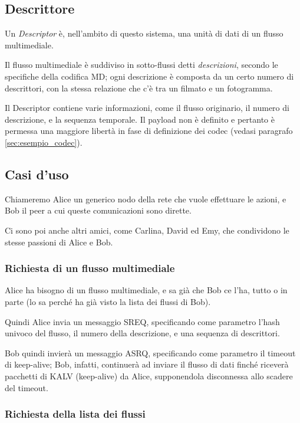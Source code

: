 \subsection{Descrittore}


Un \emph{Descriptor} è, nell'ambito di questo sistema, una unità di dati di un
flusso multimediale.

Il flusso multimediale è suddiviso in sotto-flussi detti \emph{descrizioni},
secondo le specifiche della codifica MD; ogni descrizione è composta da un certo numero
di descrittori, con la stessa relazione che c'è tra un filmato e un fotogramma.

Il Descriptor contiene varie informazioni, come il flusso originario, il numero
di descrizione, e la sequenza temporale. Il payload non è definito e pertanto è
permessa una maggiore libertà in fase di definizione dei codec (vedasi
paragrafo \ref{sec:esempio_codec}).

\subsection{Casi d'uso}

Chiameremo Alice un generico nodo della rete che vuole effettuare le azioni, e
Bob il peer a cui queste comunicazioni sono dirette.

Ci sono poi anche altri amici, come Carlina, David ed Emy, che condividono le
stesse passioni di Alice e Bob.


\subsubsection{Richiesta di un flusso multimediale}
%

Alice ha bisogno di un flusso multimediale, e sa già che Bob ce l'ha, tutto o in
parte (lo sa perché ha già visto la lista dei flussi di Bob).

Quindi Alice invia un messaggio SREQ, specificando come parametro l'hash univoco
del flusso, il numero della descrizione, e una sequenza di descrittori.

Bob quindi invierà un messaggio ASRQ, specificando come parametro il timeout di
keep-alive; Bob, infatti, continuerà ad inviare il flusso di dati finché riceverà
pacchetti di KALV (keep-alive) da Alice, supponendola disconnessa allo scadere
del timeout.






\subsubsection{Richiesta della lista dei flussi}
%

